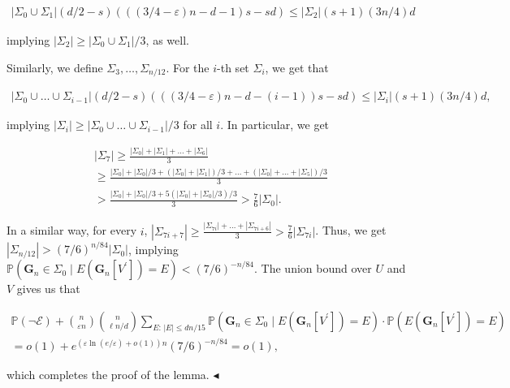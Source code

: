 \documentclass[10pt,a4paper]{article}
\begin{document}
\[\begin{gathered}
|\Sigma_{0}\cup\Sigma_{1}|(d/2-s)(((3/4-\varepsilon)n-d-1)s-sd)\leq|\Sigma_{2}|(s+1)(3n/4)d
\end{gathered}\]


implying $|\Sigma_{2}|\geq|\Sigma_{0}\cup\Sigma_{1}|/3$, as well.\par




Similarly, we define $\Sigma_{3},\ldots,\Sigma_{n/12}$. For the $i$-th set $\Sigma_{i}$, we get that\par


\[\begin{gathered}
|\Sigma_{0}\cup\ldots\cup\Sigma_{i-1}|(d/2-s)(((3/4-\varepsilon)n-d-(i-1))s-sd)\leq|\Sigma_{i}|(s+1)(3n/4)d,
\end{gathered}\]


implying $|\Sigma_{i}|\geq|\Sigma_{0}\cup\ldots\cup\Sigma_{i-1}|/3$ for all $i$. In particular, we get\par


\[\begin{gathered}
\displaystyle|\Sigma_{7}| \displaystyle\geq\frac{|\Sigma_{0}|+|\Sigma_{1}|+\ldots+|\Sigma_{6}|}{3} \\
\displaystyle\geq\frac{|\Sigma_{0}|+|\Sigma_{0}|/3+(|\Sigma_{0}|+|\Sigma_{1}|)/3+\ldots+(|\Sigma_{0}|+\ldots+|\Sigma_{5}|)/3}{3} \\
\displaystyle>\frac{|\Sigma_{0}|+|\Sigma_{0}|/3+5(|\Sigma_{0}|+|\Sigma_{0}|/3)/3}{3}>\frac{7}{6}|\Sigma_{0}|.
\end{gathered}\]


In a similar way, for every $i$,
$|\Sigma_{7i+7}|\geq\frac{|\Sigma_{7i}|+\ldots+|\Sigma_{7i+6}|}{3}>\frac{7}{6}|\Sigma_{7i}|$.
Thus, we get $|\Sigma_{n/12}|>(7/6)^{n/84}|\Sigma_{0}|$,
implying $\mathbb{P}(\mathbf{G}_{n}\in\Sigma_{0}\mid E(\mathbf{G}_{n}[V^{\prime}])=E)<(7/6)^{-n/84}$. The union bound over $U$ and $V$ gives us that\par


\[\begin{gathered}
\mathbb{P}(\neg\mathcal{E})+{n\choose\varepsilon n}{n\choose\ell n/d}\sum_{E:\,|E|\leq dn/15}\mathbb{P}(\mathbf{G}_{n}\in\Sigma_{0}\mid E(\mathbf{G}_{n}[V^{\prime}])=E)\cdot\mathbb{P}(E(\mathbf{G}_{n}[V^{\prime}])=E)\\
=o(1)+e^{(\varepsilon\ln(e/\varepsilon)+o(1))n}(7/6)^{-n/84}=o(1),
\end{gathered}\]


which completes the proof of the lemma.
$\blacktriangleleft$\par
\end{document}
